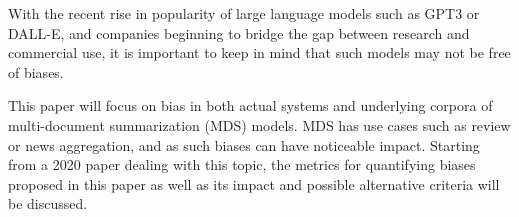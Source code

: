 \documentclass[../main.tex]{subfiles}
\begin{document}
With the recent rise in popularity of large language models such as GPT3 or DALL-E,
and companies beginning to bridge the gap between research and commercial use,
it is important to keep in mind that such models may not be free of biases.

This paper will focus on bias in both actual systems and underlying corpora of multi-document summarization (MDS) models.
MDS has use cases such as review or news aggregation, and as such biases can have noticeable impact.\cite{dey-etal-2020-corpora}
Starting from a 2020 paper\cite{dey-etal-2020-corpora} dealing with this topic,
the metrics for quantifying biases proposed in this paper as well as its impact and possible alternative criteria will be discussed.
\end{document}
